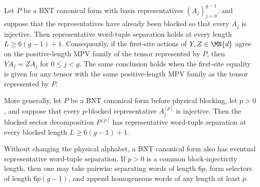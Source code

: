 \begin{lemma}
    \label{thm:postblocked_representative_grouped_insert_eq}
    \leanok
    Let $P$ be a BNT canonical form with basis representatives
    $(A_j)_{j=0}^{g-1}$, and suppose that the representatives have already
    been blocked so that every $A_j$ is injective. Then representative
    word-tuple separation holds at every length $L\geq 6(g-1)+1$.
    Consequently, if the first-site actions of $Y,Z\in\MN{d}$ agree on the
    positive-length MPV family of the tensor represented by $P$, then
    $YA_j=ZA_j$ for $0\leq j<g$.
    The same conclusion holds when the first-site equality is given for any
    tensor with the same positive-length MPV family as the tensor represented by
    $P$.

    More generally, let $P$ be a BNT canonical form before physical blocking,
    let $p>0$, and suppose that every $p$-blocked representative
    $A_j^{[p]}$ is injective. Then the blocked sector decomposition $P^{[p]}$
    has representative word-tuple separation at every blocked length
    $L\geq 6(g-1)+1$.

    Without changing the physical alphabet, a BNT canonical form also has
    eventual representative word-tuple separation. If $p>0$ is a common
    block-injectivity length, then one may take pairwise separating words of
    length $6p$, form selectors of length $6p(g-1)$, and append homogeneous
    words of any length at least $p$.


\end{lemma}
